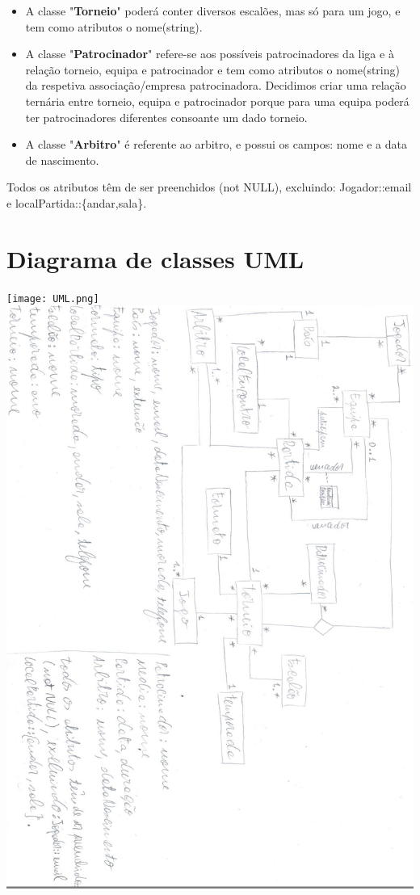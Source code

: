 \documentclass[a4paper]{article}
\begin{document}
\begin{itemize}
\item A classe "\textbf{Torneio}" poderá conter diversos escalões, mas só para um jogo, e tem como atributos o nome(string).

\item A classe "\textbf{Patrocinador}" refere-se aos possíveis patrocinadores da liga e à relação torneio, equipa e patrocinador e tem como atributos o nome(string) da respetiva associação/empresa patrocinadora. Decidimos criar uma relação ternária entre torneio, equipa e patrocinador porque para uma equipa poderá ter patrocinadores diferentes consoante um dado torneio.

\item A classe "\textbf{Arbitro}" é referente ao arbitro, e possui os campos: nome e a data de nascimento.
\end{itemize}

Todos os atributos têm de ser preenchidos (not NULL), excluindo: Jogador::email e localPartida::\{andar,sala\}.


\section{Diagrama de classes UML}

\begin{center}
  \texttt{[image: UML.png]}
  \includegraphics[scale=0.83]{BDAD_DIAGRAMA.jpeg}
\end{center}

\clearpage
{}
\renewcommand\refname{Bibliografia}


\end{document}
